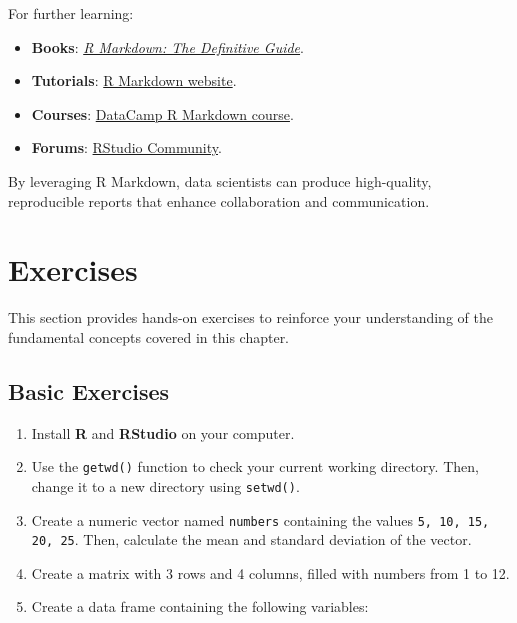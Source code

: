 \documentclass[
]{book}
\newcommand{\passthrough}[1]{#1}
\providecommand{\tightlist}{%
  \setlength{\itemsep}{0pt}\setlength{\parskip}{0pt}}
\theoremstyle{definition}
\theoremstyle{definition}
\theoremstyle{definition}
\theoremstyle{definition}
\theoremstyle{remark}
\begin{document}
For further learning:

\begin{itemize}
\tightlist
\item
  \textbf{Books}: \href{https://bookdown.org/yihui/rmarkdown/}{\emph{R Markdown: The Definitive Guide}}.\\
\item
  \textbf{Tutorials}: \href{https://rmarkdown.rstudio.com/lesson-1.html}{R Markdown website}.\\
\item
  \textbf{Courses}: \href{https://www.datacamp.com/courses/reporting-with-r-markdown}{DataCamp R Markdown course}.\\
\item
  \textbf{Forums}: \href{https://community.rstudio.com/c/rmarkdown/9}{RStudio Community}.
\end{itemize}

By leveraging R Markdown, data scientists can produce high-quality, reproducible reports that enhance collaboration and communication.

\section{Exercises}\label{intro-R-exercises}

This section provides hands-on exercises to reinforce your understanding of the fundamental concepts covered in this chapter.

\subsection*{Basic Exercises}\label{basic-exercises}

\begin{enumerate}
\def\labelenumi{\arabic{enumi}.}
\tightlist
\item
  Install \textbf{R} and \textbf{RStudio} on your computer.\\
\item
  Use the \passthrough{\lstinline!getwd()!} function to check your current working directory. Then, change it to a new directory using \passthrough{\lstinline!setwd()!}.\\
\item
  Create a numeric vector named \passthrough{\lstinline!numbers!} containing the values \passthrough{\lstinline!5, 10, 15, 20, 25!}. Then, calculate the mean and standard deviation of the vector.\\
\item
  Create a matrix with 3 rows and 4 columns, filled with numbers from 1 to 12.\\
\item
  Create a data frame containing the following variables:\\
\end{enumerate}
\end{document}
